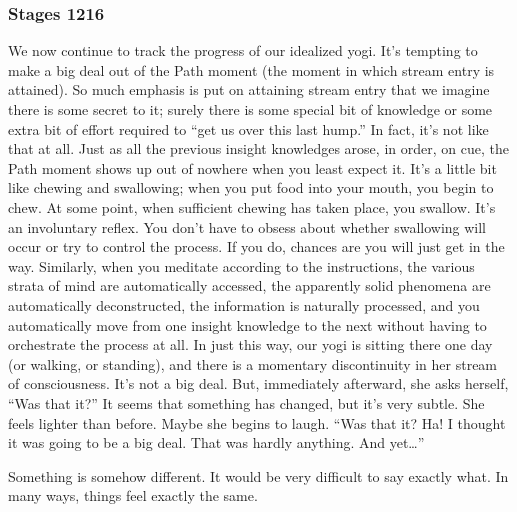 \documentclass[a5paper,10pt,english]{book}
\begin{document}
\subsubsection{Stages 12\sphinxhyphen{}16}
\label{\detokenize{main-2:stages-12-16}}
\sphinxAtStartPar
We now continue to track the progress of our idealized yogi. It’s
tempting to make a big deal out of the Path moment (the moment in which
stream entry is attained). So much emphasis is put on attaining stream
entry that we imagine there is some secret to it; surely there is some
special bit of knowledge or some extra bit of effort required to “get us
over this last hump.” In fact, it’s not like that at all. Just as all
the previous insight knowledges arose, in order, on cue, the Path moment
shows up out of nowhere when you least expect it. It’s a little bit like
chewing and swallowing; when you put food into your mouth, you begin to
chew. At some point, when sufficient chewing has taken place, you
swallow. It’s an involuntary reflex. You don’t have to obsess about
whether swallowing will occur or try to control the process. If you do,
chances are you will just get in the way. Similarly, when you meditate
according to the instructions, the various strata of mind are
automatically accessed, the apparently solid phenomena are automatically
deconstructed, the information is naturally processed, and you
automatically move from one insight knowledge to the next without having
to orchestrate the process at all. In just this way, our yogi is sitting
there one day (or walking, or standing), and there is a momentary
discontinuity in her stream of consciousness. It’s not a big deal. But,
immediately afterward, she asks herself, “Was that it?” It seems that
something has changed, but it’s very subtle. She feels lighter than
before. Maybe she begins to laugh. “Was that it? Ha! I thought it was
going to be a big deal. That was hardly anything. And yet…”

\sphinxAtStartPar
Something is somehow different. It would be very difficult to say
exactly what. In many ways, things feel exactly the same.
\end{document}
